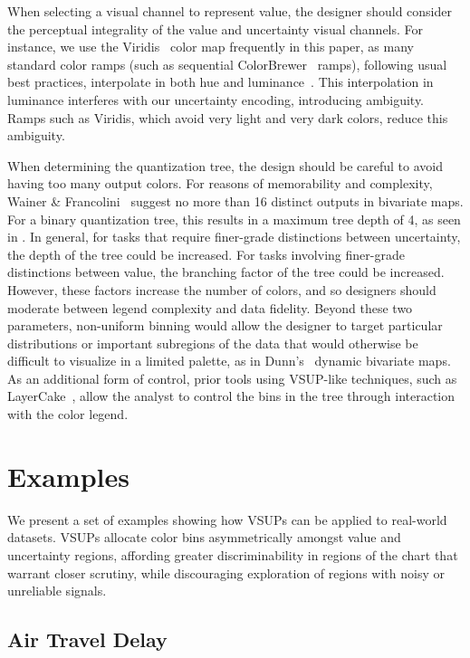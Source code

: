 When selecting a visual channel to represent value, the designer should consider the perceptual integrality of the value and uncertainty visual channels. For instance, we use the Viridis~\cite{viridis} color map frequently in this paper, as many standard color ramps (such as sequential ColorBrewer~\cite{harrower2003colorbrewer} ramps), following usual best practices, interpolate in both hue and luminance~\cite{ware1988color}. This interpolation in luminance interferes with our uncertainty encoding, introducing ambiguity. Ramps such as Viridis, which avoid very light and very dark colors, reduce this ambiguity.

When determining the quantization tree, the design should be careful to avoid having too many output colors. For reasons of memorability and complexity, Wainer \& Francolini~\cite{wainer1980empirical} suggest no more than 16 distinct outputs in bivariate maps. For a binary quantization tree, this results in a maximum tree depth of 4, as seen in . In general, for tasks that require finer-grade distinctions between uncertainty, the depth of the tree could be increased. For tasks involving finer-grade distinctions between value, the branching factor of the tree could be increased. However, these factors increase the number of colors, and so designers should moderate between legend complexity and data fidelity. Beyond these two parameters, non-uniform binning would allow the designer to target particular distributions or important subregions of the data that would otherwise be difficult to visualize in a limited palette, as in Dunn's~\cite{dunn1989dynamic} dynamic bivariate maps. As an additional form of control, prior tools using VSUP-like techniques, such as LayerCake~\cite{correll2015layercake}, allow the analyst to control the bins in the tree through interaction with the color legend.

\section{Examples}

We present a set of examples showing how VSUPs can be applied to real-world datasets. VSUPs allocate color bins asymmetrically amongst value and uncertainty regions, affording greater discriminability in regions of the chart that warrant closer scrutiny, while discouraging exploration of regions with noisy or unreliable signals.


\subsection{Air Travel Delay}

